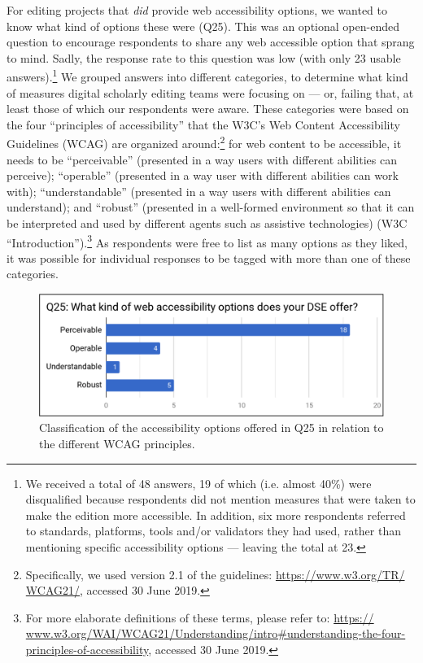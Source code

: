 \begin{paper}
For editing projects that \emph{did} provide web accessibility options,
we wanted to know what kind of options these were (Q25). This was an
optional open-ended question to encourage respondents to share any web
accessible option that sprang to mind. Sadly, the response rate to this
question was low (with only 23 usable answers).\footnote{We received a
  total of 48 answers, 19 of which (i.e. almost 40\%) were disqualified
  because respondents did not mention measures that were taken to make
  the edition more accessible. In addition, six more respondents
  referred to standards, platforms, tools and/or validators they had
  used, rather than mentioning specific accessibility options --- leaving
  the total at 23.} We grouped answers into different categories, to
determine what kind of measures digital scholarly editing teams were
focusing on --- or, failing that, at least those of which our respondents
were aware. These categories were based on the four ``principles of
accessibility'' that the W3C's Web Content Accessibility Guidelines
(WCAG) are organized around:\footnote{Specifically, we used version 2.1
  of the guidelines:
  \href{https://www.w3.org/TR/WCAG21/}{https://www.w3.org/TR/ WCAG21/}, accessed 30 June 2019.}
for web content to be accessible, it needs to be ``perceivable''
(presented in a way users with different abilities can perceive);
``operable'' (presented in a way user with different abilities can work
with); ``understandable'' (presented in a way users with different
abilities can understand); and ``robust'' (presented in a well-formed
environment so that it can be interpreted and used by different agents
such as assistive technologies) (W3C ``Introduction'').\footnote{For
  more elaborate definitions of these terms, please refer to:
  \href{https://www.w3.org/WAI/WCAG21/Understanding/intro\#understanding-the-four-principles-of-accessibility}{{https:// www.w3.org/WAI/WCAG21/Understanding/intro\#understanding-the-four-principles-of-accessibility}}, accessed 30 June 2019.}
As respondents were free to list as many options as they liked, it was
possible for individual responses to be tagged with more than one of
these categories.

\begin{figure}[h!]
\includegraphics[width=\textwidth]{media/martinez4.png}
\caption{Classification of the accessibility options offered in
Q25 in relation to the different WCAG principles.}
\label{q25}
\end{figure}


\end{paper}
